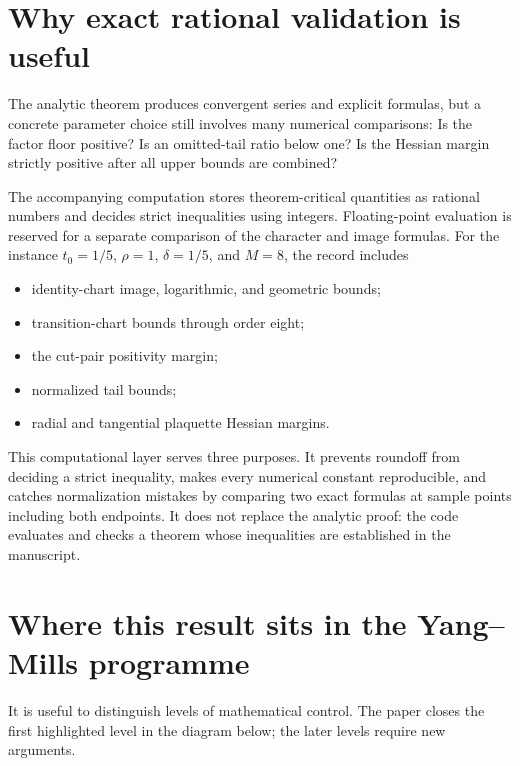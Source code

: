 \documentclass[11pt]{article}
\theoremstyle{definition}
\begin{document}
\section{Why exact rational validation is useful}

The analytic theorem produces convergent series and explicit formulas, but a
concrete parameter choice still involves many numerical comparisons: Is the
factor floor positive?  Is an omitted-tail ratio below one?  Is the Hessian
margin strictly positive after all upper bounds are combined?

The accompanying computation stores theorem-critical quantities as rational
numbers and decides strict inequalities using integers.  Floating-point
evaluation is reserved for a separate comparison of the character and image
formulas.  For the instance $t_0=1/5$, $\rho=1$, $\delta=1/5$, and $M=8$, the
record includes
\begin{itemize}
\item identity-chart image, logarithmic, and geometric bounds;
\item transition-chart bounds through order eight;
\item the cut-pair positivity margin;
\item normalized tail bounds;
\item radial and tangential plaquette Hessian margins.
\end{itemize}

This computational layer serves three purposes.  It prevents roundoff from
deciding a strict inequality, makes every numerical constant reproducible,
and catches normalization mistakes by comparing two exact formulas at sample
points including both endpoints.  It does not replace the analytic proof:
the code evaluates and checks a theorem whose inequalities are established in
the manuscript.

\section{Where this result sits in the Yang--Mills programme}

It is useful to distinguish levels of mathematical control.  The paper closes
the first highlighted level in the diagram below; the later levels require
new arguments.
\end{document}
